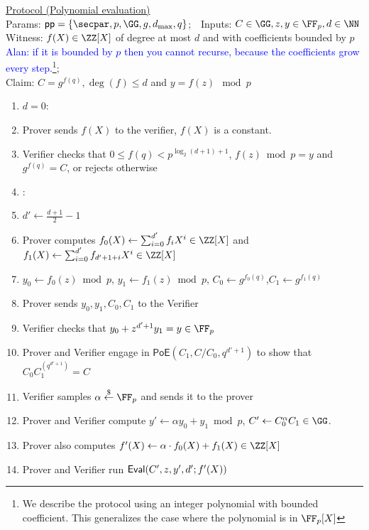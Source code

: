 \documentclass{article}
\theoremstyle{definition}
\begin{document}
\begin{small}
 \begin{minipage}{1.1\textwidth}
\begin{mdframed}[userdefinedwidth=1\textwidth]  \label{prot:Opening}
	\noindent \underline{\textsf{Protocol \eval} (Polynomial evaluation)}\\
\noindent Params: $\crs=\{\secpar,p,\GG,g,d_{\max},q\}$;\ \
Inputs: $C\in \GG,z,y\in \FF_p,d \in \NN $\\
Witness: $f(X) \in \ZZ[X]$ of degree at most $d$ and with coefficients bounded by $p$ \textcolor{blue}{Alan: if it is bounded by $p$ then you cannot recurse, because the coefficients grow every step.}\footnote{We describe the protocol using an integer polynomial with bounded coefficient. This generalizes the case where the polynomial is in $\FF_p[X]$};\\ 
Claim: $C=g^{f(q)},\deg(f)\leq d$ and $y=f(z) \mod p$

\begin{enumerate}[nolistsep]
\item \pcif $d=0$:
\item \pcind[1] Prover sends $f(X)$ to the verifier, $f(X)$ is a constant. 
\item \pcind[1] Verifier checks that $0\leq f(q)<  p^{\log_2(d+1)+1}$,  $f(z) \bmod p=y$ and $g^{f(q)}=C$, or rejects otherwise 
\item \pcelse: 
\item \pcind[1] $d'\gets \frac{d+1}{2}-1$
\item \pcind[1] Prover computes $f_0(X)\gets\sum_{i=0}^{d'} f_i X^i\in \ZZ[X]$ and $f_1(X)\gets\sum_{i=0}^{d'} f_{d'+1+i} X^{i}\in \ZZ[X]$
\item \pcind[1] $y_0\gets f_0(z) \bmod p$, $y_1\gets f_1(z)\bmod p$, $C_0\gets g^{f_0(q)}$,$C_1\gets g^{f_1(q)}$
\item \pcind[1] Prover sends $y_0,y_1,C_0,C_1$ to the Verifier
\item \pcind[1] Verifier checks that $y_0+z^{d'+1} y_1=y\in \FF_p$ 
\item \pcind[1] Prover and Verifier engage in $\textsf{PoE}(C_1,C/C_0,q^{d'+1})$ to show that $C_0C_1^{(q^{d'+1})}=C$
\item \pcind[1] Verifier samples $\alpha \sample \FF_p$ and sends it to the prover
\item \pcind[1] Prover and Verifier compute $y'\gets\alpha y_0 +y_1 \bmod p$, $C'\gets C_0^{\alpha}C_1 \in \GG$. 
\item \pcind[1] Prover also computes $f'(X)\gets\alpha  \cdot f_0(X)+f_1(X) \in \ZZ[X]$ 
\item \pcind[1] Prover and Verifier run $\textsf{{Eval}}(C',z,y',d';f'(X))$
\end{enumerate}
\end{mdframed}
\end{minipage}
\end{small}
\end{document}

